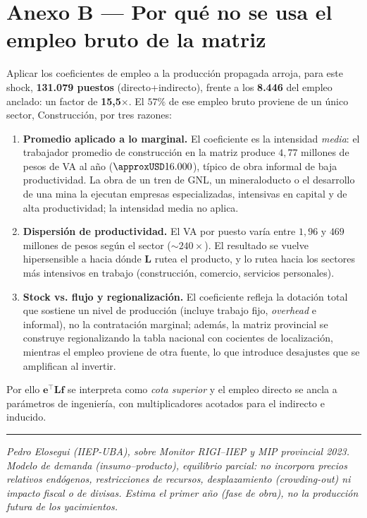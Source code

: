 \documentclass[11pt]{article}
\begin{document}
\section{Anexo B --- Por qué no se usa el empleo bruto de la matriz}
Aplicar los coeficientes de empleo a la producción propagada arroja, para este shock, \textbf{131.079 puestos} (directo+indirecto), frente a los \textbf{8.446} del empleo anclado: un factor de \textbf{15{,}5$\times$}. El $57\%$ de ese empleo bruto proviene de un único sector, Construcción, por tres razones:
\begin{enumerate}
\item \textbf{Promedio aplicado a lo marginal.} El coeficiente es la intensidad \emph{media}: el trabajador promedio de construcción en la matriz produce $4,77$ millones de pesos de VA al año ($\approxUSD 16.000$), típico de obra informal de baja productividad. La obra de un tren de GNL, un mineraloducto o el desarrollo de una mina la ejecutan empresas especializadas, intensivas en capital y de alta productividad; la intensidad media no aplica.
\item \textbf{Dispersión de productividad.} El VA por puesto varía entre $1,96$ y $469$ millones de pesos según el sector ($\sim\!240\times$). El resultado se vuelve hipersensible a hacia dónde $\mathbf{L}$ rutea el producto, y lo rutea hacia los sectores más intensivos en trabajo (construcción, comercio, servicios personales).
\item \textbf{Stock vs. flujo y regionalización.} El coeficiente refleja la dotación total que sostiene un nivel de producción (incluye trabajo fijo, \emph{overhead} e informal), no la contratación marginal; además, la matriz provincial se construye regionalizando la tabla nacional con cocientes de localización, mientras el empleo proviene de otra fuente, lo que introduce desajustes que se amplifican al invertir.
\end{enumerate}
\noindent Por ello $\mathbf{e}^{\top}\mathbf{L}\mathbf{f}$ se interpreta como \emph{cota superior} y el empleo directo se ancla a parámetros de ingeniería, con multiplicadores acotados para el indirecto e inducido.

\vspace{4pt}
\hrule
\vspace{3pt}
{\footnotesize\itshape Pedro Elosegui (IIEP-UBA), sobre Monitor RIGI--IIEP y MIP provincial 2023. Modelo de demanda (insumo--producto), equilibrio parcial: no incorpora precios relativos endógenos, restricciones de recursos, desplazamiento (\emph{crowding-out}) ni impacto fiscal o de divisas. Estima el primer año (fase de obra), no la producción futura de los yacimientos.}
\end{document}
